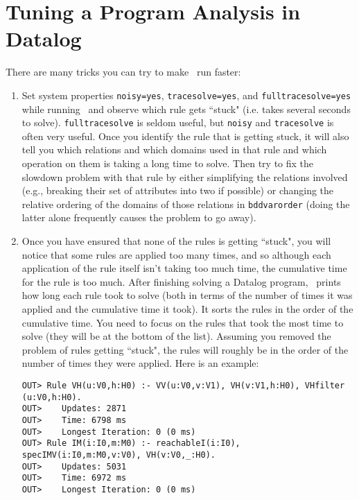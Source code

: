 \section{Tuning a Program Analysis in Datalog}
\label{sec:tuning-datalog-analysis}

There are many tricks you can try to make \bddbddb\ run faster:

\begin{enumerate}
\item
Set system properties \verb+noisy=yes+, \verb+tracesolve=yes+, and \verb+fulltracesolve=yes+
while running \bddbddb\ and observe which rule gets ``stuck" (i.e. takes several seconds to solve).
\verb+fulltracesolve+ is seldom useful, but \verb+noisy+ and \verb+tracesolve+ is
often very useful.  Once you identify the rule that is getting stuck, it
will also tell you which relations and which domains used in that rule
and which operation on them is taking a long time to solve.  Then try
to fix the slowdown problem with that rule by either simplifying the
relations involved (e.g., breaking their set of attributes into two if
possible) or changing the relative ordering of the domains of those
relations in \verb+bddvarorder+ (doing the latter alone
frequently causes the problem to go away).

\item
Once you have ensured that none of the rules is getting ``stuck",
you will notice that some rules are applied too many times, and so
although each application of the rule itself isn't taking too much
time, the cumulative time for the rule is too much.  After finishing
solving a Datalog program, \bddbddb\ prints how long each rule took to
solve (both in terms of the number of times it was applied and the
cumulative time it took).  It sorts the rules in the order of the
cumulative time.  You need to focus on the rules that took the most
time to solve (they will be at the bottom of the list).  Assuming you
removed the problem of rules getting ``stuck", the rules will roughly
be in the order of the number of times they were applied.  Here is an
example:

\begin{verbatim}
OUT> Rule VH(u:V0,h:H0) :- VV(u:V0,v:V1), VH(v:V1,h:H0), VHfilter
(u:V0,h:H0).
OUT>    Updates: 2871
OUT>    Time: 6798 ms
OUT>    Longest Iteration: 0 (0 ms)
OUT> Rule IM(i:I0,m:M0) :- reachableI(i:I0), specIMV(i:I0,m:M0,v:V0), VH(v:V0,_:H0).
OUT>    Updates: 5031
OUT>    Time: 6972 ms
OUT>    Longest Iteration: 0 (0 ms)
\end{verbatim}


\end{enumerate}
